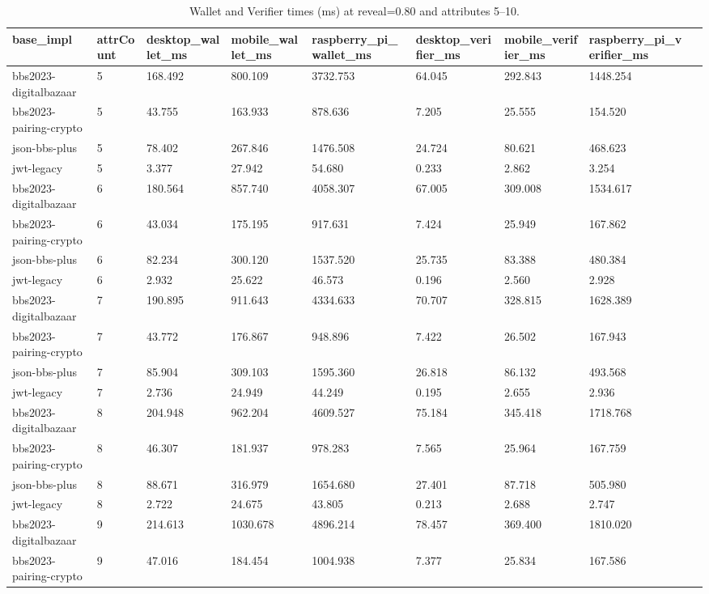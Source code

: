 \begin{table}[t]
\centering
\caption{Wallet and Verifier times (ms) at reveal=0.80 and attributes 5--10.}
\label{tab:times-filtered}
\begin{tabular}{lllllllll}\toprule
base\_impl & attrCount & desktop\_wallet\_ms & mobile\_wallet\_ms & raspberry\_pi\_wallet\_ms & desktop\_verifier\_ms & mobile\_verifier\_ms & raspberry\_pi\_verifier\_ms \\\midrule
bbs2023-digitalbazaar & 5 & 168.492 & 800.109 & 3732.753 & 64.045 & 292.843 & 1448.254 \\
bbs2023-pairing-crypto & 5 & 43.755 & 163.933 & 878.636 & 7.205 & 25.555 & 154.520 \\
json-bbs-plus & 5 & 78.402 & 267.846 & 1476.508 & 24.724 & 80.621 & 468.623 \\
jwt-legacy & 5 & 3.377 & 27.942 & 54.680 & 0.233 & 2.862 & 3.254 \\
bbs2023-digitalbazaar & 6 & 180.564 & 857.740 & 4058.307 & 67.005 & 309.008 & 1534.617 \\
bbs2023-pairing-crypto & 6 & 43.034 & 175.195 & 917.631 & 7.424 & 25.949 & 167.862 \\
json-bbs-plus & 6 & 82.234 & 300.120 & 1537.520 & 25.735 & 83.388 & 480.384 \\
jwt-legacy & 6 & 2.932 & 25.622 & 46.573 & 0.196 & 2.560 & 2.928 \\
bbs2023-digitalbazaar & 7 & 190.895 & 911.643 & 4334.633 & 70.707 & 328.815 & 1628.389 \\
bbs2023-pairing-crypto & 7 & 43.772 & 176.867 & 948.896 & 7.422 & 26.502 & 167.943 \\
json-bbs-plus & 7 & 85.904 & 309.103 & 1595.360 & 26.818 & 86.132 & 493.568 \\
jwt-legacy & 7 & 2.736 & 24.949 & 44.249 & 0.195 & 2.655 & 2.936 \\
bbs2023-digitalbazaar & 8 & 204.948 & 962.204 & 4609.527 & 75.184 & 345.418 & 1718.768 \\
bbs2023-pairing-crypto & 8 & 46.307 & 181.937 & 978.283 & 7.565 & 25.964 & 167.759 \\
json-bbs-plus & 8 & 88.671 & 316.979 & 1654.680 & 27.401 & 87.718 & 505.980 \\
jwt-legacy & 8 & 2.722 & 24.675 & 43.805 & 0.213 & 2.688 & 2.747 \\
bbs2023-digitalbazaar & 9 & 214.613 & 1030.678 & 4896.214 & 78.457 & 369.400 & 1810.020 \\
bbs2023-pairing-crypto & 9 & 47.016 & 184.454 & 1004.938 & 7.377 & 25.834 & 167.586 \\

\end{tabular}
\end{table}
